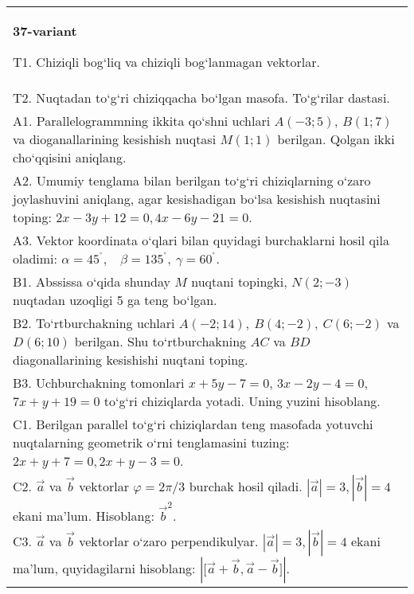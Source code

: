 \documentclass{article}
\begin{document}
\begin{tabular}{m{17cm}}
\textbf{37-variant}

T1. 
Chiziqli bog‘liq va chiziqli bog‘lanmagan vektorlar.
 \\
T2. 
Nuqtadan to‘g‘ri chiziqqacha bo‘lgan masofa. To‘g‘rilar dastasi.
 \\
A1. 
Parallelogrammning ikkita qo‘shni uchlari $A (-3;5) $, $B (1;7) $
va dioganallarining kesishish nuqtasi $M (1;1)$ berilgan. Qolgan ikki
cho‘qqisini aniqlang.
 \\
A2. 
Umumiy tenglama bilan berilgan to‘g‘ri chiziqlarning
o‘zaro joylashuvini aniqlang, agar kesishadigan bo‘lsa kesishish nuqtasini
toping: $2x-3y+12=0, 4x-6y-21=0$.
 \\
A3. 
Vektor koordinata o‘qlari bilan quyidagi burchaklarni hosil qila oladimi:
$\alpha = 45^{{^\circ}},\ \ \ \ \beta = 135^{{^\circ}},\ \gamma = 60^{{^\circ}}$.
 \\
B1. 
Abssissa o‘qida shunday $M$ nuqtani topingki,
\(N (2;-3) \) nuqtadan uzoqligi 5 ga teng bo‘lgan.
 \\
B2. 
To‘rtburchakning uchlari
\(A (-2;14),\ B (4;-2),\ C (6;-2) \) va \(D (6;10) \) berilgan. Shu
to‘rtburchakning $AC$ va $BD$ diagonallarining kesishishi
nuqtani toping.
 \\
B3. 
Uchburchakning tomonlari \(x+5y-7=0\),
\(3x-2y-4=0\), \(7x+y+19=0\) to‘g‘ri chiziqlarda yotadi. Uning
yuzini hisoblang.
 \\
C1. 
Berilgan parallel to‘g‘ri chiziqlardan teng masofada yotuvchi
nuqtalarning geometrik o‘rni tenglamasini tuzing: $2x+y+7=0, 2x+y-3=0$.
 \\
C2. 
$\vec{a}$ va $\vec{b}$ vektorlar $\varphi = 2\pi/3$ burchak hosil qiladi. $|\vec{a}| = 3,|\vec{b}| = 4$ ekani ma’lum. Hisoblang:
${\vec{b}}^{2}$.
 \\
C3. 
$\vec{a}$ va $\vec{b}$ vektorlar o‘zaro perpendikulyar. $|\vec{a}| = 3,|\vec{b}| = 4$ ekani ma’lum, quyidagilarni hisoblang:
$|\lbrack\vec{a} + \vec{b},\vec{a} - \vec{b}\rbrack|$.
 \\

\end{tabular}
\vspace{1cm}
\end{document}
